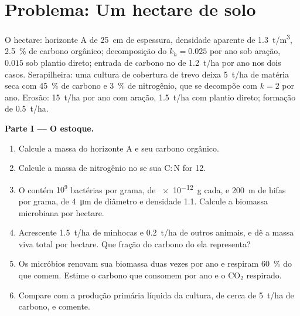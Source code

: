 \section{Problema: Um hectare de solo}

\begin{problem}
\label{pb:b2:living-soil:1}
O hectare: horizonte A de \qty{25}{cm} de espessura, densidade aparente
de \qty{1.3}{t/m^3}, \qty{2.5}{\%} de carbono orgânico; decomposição do
 $k_h =
0.025$ por ano sob aração, $0.015$ sob plantio direto; entrada de carbono
no  de \qty{1.2}{t/ha} por ano nos dois casos. Serapilheira: uma
cultura de cobertura de trevo deixa \qty{5}{t/ha} de matéria seca com
\qty{45}{\%} de carbono e \qty{3}{\%} de nitrogênio, que se decompõe com
$k = 2$ por ano. Erosão: \qty{15}{t/ha} por ano com aração,
\qty{1.5}{t/ha} com plantio direto; formação de \qty{0.5}{t/ha}.

\medskip
\noindent\textbf{Parte I --- O estoque.}
\begin{enumerate}
  \item Calcule a massa do horizonte A e seu carbono orgânico.
  \item Calcule a massa de nitrogênio no  se sua
        $\mathrm{C:N}$ for 12.
  \item O  contém $10^{9}$ bactérias por grama, de \qty{e-12}{g}
        cada, e \qty{200}{m} de hifas por grama, de \qty{4}{\micro m}
        de diâmetro e densidade 1.1. Calcule a biomassa microbiana por
        hectare.
  \item Acrescente \qty{1.5}{t/ha} de minhocas e \qty{0.2}{t/ha} de
        outros animais, e dê a massa viva total por hectare.
        Que fração do carbono do  ela representa?
  \item Os micróbios renovam sua biomassa duas vezes por ano e
        respiram \qty{60}{\%} do que comem. Estime o carbono que
        consomem por ano e o $\mathrm{CO_2}$ respirado.
  \item Compare com a produção primária líquida da cultura, de cerca de
        \qty{5}{t/ha} de carbono, e comente.
\end{enumerate}


\end{problem}
